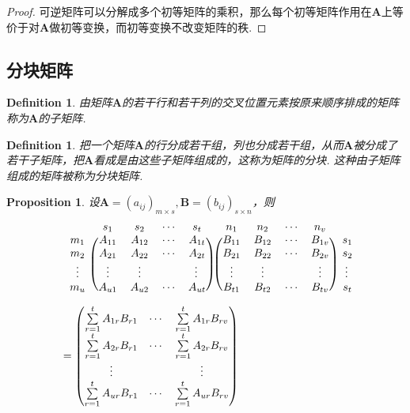 \documentclass{article}
\newtheorem{proposition}[theorem]{Proposition}
\newtheorem{definition}[theorem]{Definition}
\newcommand{\mbf}[1]{\bm{#1}}
\begin{document}
\begin{proof}
可逆矩阵可以分解成多个初等矩阵的乘积，那么每个初等矩阵作用在$\mbf{A}$上等价于对$\mbf{A}$做初等变换，而初等变换不改变矩阵的秩. 
\end{proof}

\subsection{分块矩阵}

\begin{definition}
\rm 由矩阵$\mbf{A}$的若干行和若干列的交叉位置元素按原来顺序排成的矩阵称为$\mbf{A}$的子矩阵.
\end{definition}

\begin{definition}
\rm 把一个矩阵$\mbf{A}$的行分成若干组，列也分成若干组，从而$\mbf{A}$被分成了若干子矩阵，把$\mbf{A}$看成是由这些子矩阵组成的，这称为矩阵的分块. 这种由子矩阵组成的矩阵被称为分块矩阵.
\end{definition}

\begin{proposition}
\rm 设$\mbf{A}=(a_{ij})_{m \times s},\mbf{B}=(b_{ij})_{s \times n}$，则
$$
\begin{array}{ll}
&\begin{blockarray}{ccccc}
    & s_1    & s_2    & \cdots & s_t  \\
\begin{block}{c(cccc)}    
m_1 & A_{11} & A_{12} & \cdots & A_{1t} \\
m_2 & A_{21} & A_{22} & \cdots & A_{2t} \\
\vdots & \vdots & \vdots & 		 & \vdots \\
m_u & A_{u1} & A_{u2} & \cdots & A_{ut} \\
\end{block} 
\end{blockarray}~
\begin{blockarray}{ccccc}
n_1    & n_2    & \cdots & n_v  &\\
\begin{block}{(cccc)c}
B_{11} & B_{12} & \cdots & B_{1v} & s_1 \\
B_{21} & B_{22} & \cdots & B_{2v} & s_2 \\
\vdots & \vdots & 		 & \vdots & \vdots \\
B_{t1} & B_{t2} & \cdots & B_{tv} & s_t \\
\end{block}
\end{blockarray}\\
&= \begin{pmatrix}
\sum\limits_{r=1}^t A_{1r}B_{r1} & \cdots & \sum\limits_{r=1}^t A_{1r}B_{rv} \\
\sum\limits_{r=1}^t A_{2r}B_{r1} & \cdots & \sum\limits_{r=1}^t A_{2r}B_{rv} \\
\vdots && \vdots \\
\sum\limits_{r=1}^t A_{ur}B_{r1} & \cdots & \sum\limits_{r=1}^t A_{ur}B_{rv} 
\end{pmatrix}
\end{array}
$$
\end{proposition}
\end{document}
